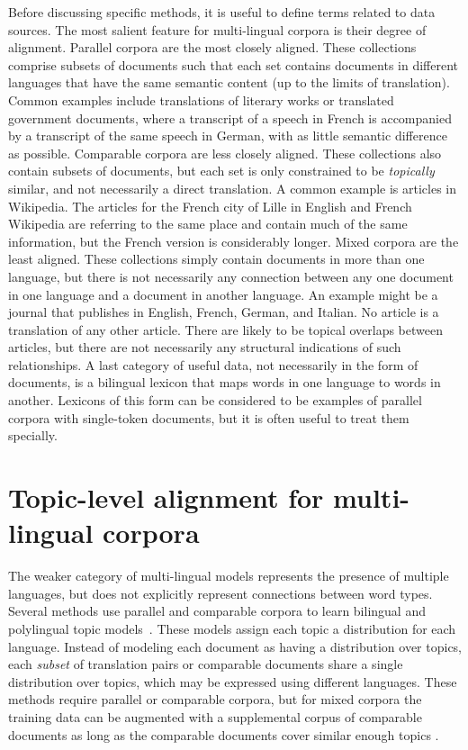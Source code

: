 Before discussing specific methods, it is useful to define terms related to data sources.
The most salient feature for multi-lingual corpora is their degree of alignment.
Parallel corpora are the most closely aligned. These collections comprise subsets of documents such that each set contains documents in different languages that have the same semantic content (up to the limits of translation).
Common examples include translations of literary works or translated government documents, where a transcript of a speech in French is accompanied by a transcript of the  same speech in German, with as little semantic difference as possible.
Comparable corpora are less closely aligned. 
These collections also contain subsets of documents, but each set is only constrained to be {\em topically} similar, and not necessarily a direct translation.
A common example is articles in Wikipedia.
The articles for the French city of Lille in English and French Wikipedia are referring to the same place and contain much of the same information, but the French version is considerably longer.
Mixed corpora are the least aligned. These collections simply contain documents in more than one language, but there is not necessarily any connection between any one document in one language and a document in another language.
An example might be a journal that publishes in English, French, German, and Italian.
No article is a translation of any other article.
There are likely to be topical overlaps between articles, but there are not necessarily any structural indications of such relationships.
A last category of useful data, not necessarily in the form of documents, is a bilingual lexicon that maps words in one language to words in another.
Lexicons of this form can be considered to be examples of parallel corpora with single-token documents, but it is often useful to treat them specially.

\section{Topic-level alignment for multi-lingual corpora}

The weaker category of multi-lingual models represents the presence of multiple languages, but does not explicitly represent connections between word types.
Several methods use parallel and comparable corpora to learn bilingual \cite{zhao-06} and polylingual topic models~\citep{mimno-09}.
These models assign each topic a distribution for each language.
Instead of modeling each document as having a distribution over topics, each {\em subset} of translation pairs or comparable documents share a single distribution over topics, which may be expressed using different languages.
These methods require parallel or comparable corpora, but for mixed corpora the training data can be augmented with a supplemental corpus of comparable documents as long as  the comparable documents cover similar enough topics \cite{mimno-12b}.


